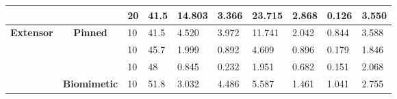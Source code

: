 \documentclass[utf8]{frontiers_suppmat} %
\begin{document}
\begin{table}[htbp]
{\begin{tabular}{|cc|l|l|lll|lll|}
\multicolumn{1}{|c|}{} &
   &
  20 &
  41.5 &
  \multicolumn{1}{l|}{14.803} &
  \multicolumn{1}{l|}{3.366} &
  23.715 &
  \multicolumn{1}{l|}{2.868} &
  \multicolumn{1}{l|}{0.126} &
  3.550 \\ \hline
\multicolumn{1}{|c|}{\multirow{4}{*}{\textbf{Extensor}}} &
  \multirow{3}{*}{\textbf{Pinned}} &
  10 &
  41.5 &
  \multicolumn{1}{l|}{4.520} &
  \multicolumn{1}{l|}{3.972} &
  11.741 &
  \multicolumn{1}{l|}{2.042} &
  \multicolumn{1}{l|}{0.844} &
  3.588 \\ \cline{3-10} 
\multicolumn{1}{|c|}{} &
   &
  10 &
  45.7 &
  \multicolumn{1}{l|}{1.999} &
  \multicolumn{1}{l|}{0.892} &
  4.609 &
  \multicolumn{1}{l|}{0.896} &
  \multicolumn{1}{l|}{0.179} &
  1.846 \\ \cline{3-10} 
\multicolumn{1}{|c|}{} &
   &
  10 &
  48 &
  \multicolumn{1}{l|}{0.845} &
  \multicolumn{1}{l|}{0.232} &
  1.951 &
  \multicolumn{1}{l|}{0.682} &
  \multicolumn{1}{l|}{0.151} &
  2.068 \\ \cline{2-10} 
\multicolumn{1}{|c|}{} &
  \multicolumn{1}{l|}{\textbf{Biomimetic}} &
  10 &
  51.8 &
  \multicolumn{1}{l|}{3.032} &
  \multicolumn{1}{l|}{4.486} &
  5.587 &
  \multicolumn{1}{l|}{1.461} &
  \multicolumn{1}{l|}{1.041} &
  2.755 \\ \hline
\end{tabular}
}
\end{table}
\end{document}
